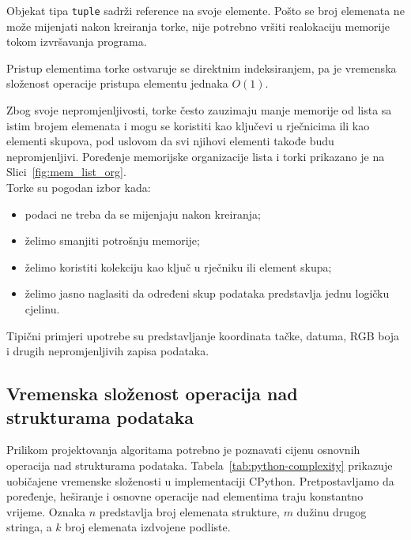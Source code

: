 Objekat tipa \texttt{tuple} sadrži reference na svoje elemente. Pošto se broj elemenata ne može mijenjati nakon kreiranja torke, nije potrebno vršiti realokaciju memorije tokom izvršavanja programa.

Pristup elementima torke ostvaruje se direktnim indeksiranjem, pa je vremenska složenost operacije pristupa elementu jednaka $O(1)$.

Zbog svoje nepromjenljivosti, torke često zauzimaju manje memorije od lista sa istim brojem elemenata i mogu se koristiti kao ključevi u rječnicima ili kao elementi skupova, pod uslovom da svi njihovi elementi takođe budu nepromjenljivi. Poređenje memorijske organizacije lista i torki prikazano je na Slici~\ref{fig:mem_list_org}.\\ 



Torke su pogodan izbor kada:

\begin{itemize}
	\item podaci ne treba da se mijenjaju nakon kreiranja;
	\item želimo smanjiti potrošnju memorije;
	\item želimo koristiti kolekciju kao ključ u rječniku ili element skupa;
	\item želimo jasno naglasiti da određeni skup podataka predstavlja jednu logičku cjelinu.
\end{itemize}

Tipični primjeri upotrebe su predstavljanje koordinata tačke, datuma, RGB boja i drugih nepromjenljivih zapisa podataka.

\subsection{Vremenska složenost operacija nad strukturama podataka}

Prilikom projektovanja algoritama potrebno je poznavati cijenu osnovnih operacija nad strukturama podataka. Tabela~\ref{tab:python-complexity} prikazuje uobičajene vremenske složenosti u implementaciji CPython. Pretpostavljamo da poređenje, heširanje i osnovne operacije nad elementima traju konstantno vrijeme. Oznaka $n$ predstavlja broj elemenata strukture, $m$ dužinu drugog stringa, a $k$ broj elemenata izdvojene podliste.

